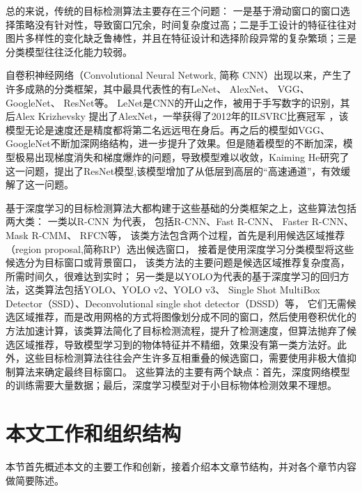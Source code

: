 总的来说，传统的目标检测算法主要存在三个问题：
一是基于滑动窗口的窗口选择策略没有针对性，导致窗口冗余，时间复杂度过高；二是手工设计的特征往往对图片多样性的变化缺乏鲁棒性，并且在特征设计和选择阶段异常的复杂繁琐；三是分类模型往往泛化能力较弱。

自卷积神经网络\cite{lecun1998gradient}（Convolutional Neural Network, 简称 CNN）出现以来，产生了许多成熟的分类框架，其中最具代表性的有LeNet\cite{lecun1998gradient}、
AlexNet\cite{krizhevsky2012imagenet}、
VGG\cite{simonyan2014very}、
GoogleNet\cite{szegedy2015going}、
ResNet\cite{he2016deep}等。
LeNet是CNN的开山之作，被用于手写数字的识别，其后Alex Krizhevsky 提出了AlexNet，一举获得了2012年的ILSVRC比赛冠军
，该模型无论是速度还是精度都将第二名远远甩在身后。再之后的模型如VGG、GoogleNet不断加深网络结构，进一步提升了效果。但是随着模型的不断加深，模型极易出现梯度消失和梯度爆炸的问题，导致模型难以收敛，Kaiming He研究了这一问题，提出了ResNet模型,该模型增加了从低层到高层的“高速通道”，有效缓解了这一问题。

基于深度学习的目标检测算法大都构建于这些基础的分类框架之上，这些算法包括两大类：
一类以R-CNN\cite{girshick2014rich}
为代表，
包括R-CNN\cite{girshick2014rich}、Fast R-CNN\cite{girshick2015fast}、
Faster R-CNN\cite{ren2015faster}、Mask R-CMM\cite{he2017mask}、
RFCN\cite{dai2016r}等，
该类方法包含两个过程，首先是利用候选区域推荐（region proposal,简称RP）选出候选窗口，
接着是使用深度学习分类模型将这些候选分为目标窗口或背景窗口，
该类方法的主要问题是候选区域推荐复杂度高，所需时间久，很难达到实时；
另一类是以YOLO\cite{redmon2016you}为代表的基于深度学习的回归方法，这类算法包括YOLO、YOLO v2\cite{redmon2016yolo9000}、YOLO v3\cite{yolov3}、
Single Shot MultiBox Detector\cite{liu2016ssd}（SSD）、Deconvolutional single shot detector\cite{fu2017dssd}（DSSD）等，
它们无需候选区域推荐，而是改用网格的方式将图像划分成不同的窗口，然后使用卷积优化的方法加速计算，该类算法简化了目标检测流程，提升了检测速度，但算法抛弃了候选区域推荐，导致模型学习到的物体特征并不精细，效果没有第一类方法好。此外，这些目标检测算法往往会产生许多互相重叠的候选窗口，需要使用非极大值抑制算法来确定最终目标窗口。
这些算法的主要有两个缺点：首先，深度网络模型的训练需要大量数据；最后，深度学习模型对于小目标物体检测效果不理想。

\section{本文工作和组织结构}

本节首先概述本文的主要工作和创新，接着介绍本文章节结构，并对各个章节内容做简要陈述。

